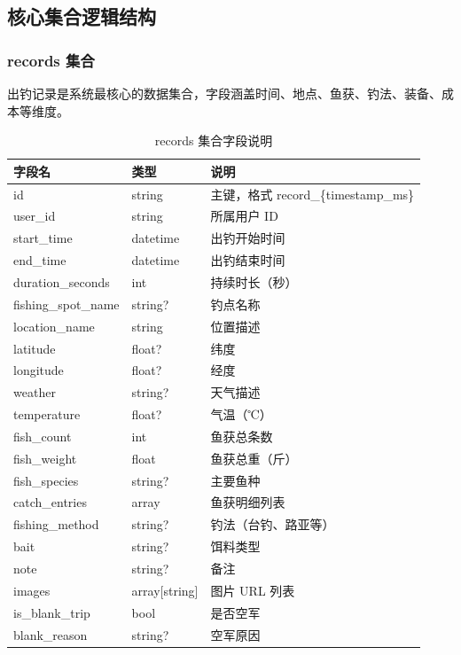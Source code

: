\documentclass[12pt,a4paper]{ctexart}
\begin{document}
\subsection{核心集合逻辑结构}

\subsubsection{records 集合}

出钓记录是系统最核心的数据集合，字段涵盖时间、地点、鱼获、钓法、装备、成本等维度。

\begin{table}[H]
  \centering
  \caption{records 集合字段说明}
  \label{tab:records-schema}
  \begin{tabular}{p{3.5cm}p{2cm}p{6.5cm}}
    \toprule
    \textbf{字段名} & \textbf{类型} & \textbf{说明} \\
    \midrule
    id & string & 主键，格式 record\_\{timestamp\_ms\} \\
    user\_id & string & 所属用户 ID \\
    start\_time & datetime & 出钓开始时间 \\
    end\_time & datetime & 出钓结束时间 \\
    duration\_seconds & int & 持续时长（秒） \\
    fishing\_spot\_name & string? & 钓点名称 \\
    location\_name & string & 位置描述 \\
    latitude & float? & 纬度 \\
    longitude & float? & 经度 \\
    weather & string? & 天气描述 \\
    temperature & float? & 气温（℃） \\
    fish\_count & int & 鱼获总条数 \\
    fish\_weight & float & 鱼获总重（斤） \\
    fish\_species & string? & 主要鱼种 \\
    catch\_entries & array & 鱼获明细列表 \\
    fishing\_method & string? & 钓法（台钓、路亚等） \\
    bait & string? & 饵料类型 \\
    note & string? & 备注 \\
    images & array[string] & 图片 URL 列表 \\
    is\_blank\_trip & bool & 是否空军 \\
    blank\_reason & string? & 空军原因 \\

\end{tabular}
\end{table}
\end{document}

